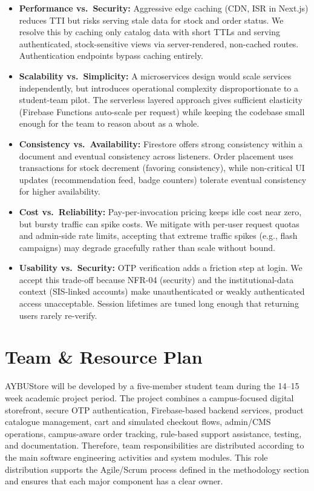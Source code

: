 \documentclass[11pt,a4paper]{article}
\begin{document}
\begin{itemize}
    \item \textbf{Performance vs.\ Security:} Aggressive edge caching (CDN, ISR in Next.js) reduces TTI but risks serving stale data for stock and order status. We resolve this by caching only catalog data with short TTLs and serving authenticated, stock-sensitive views via server-rendered, non-cached routes. Authentication endpoints bypass caching entirely.
    \item \textbf{Scalability vs.\ Simplicity:} A microservices design would scale services independently, but introduces operational complexity disproportionate to a student-team pilot. The serverless layered approach gives sufficient elasticity (Firebase Functions auto-scale per request) while keeping the codebase small enough for the team to reason about as a whole.
    \item \textbf{Consistency vs.\ Availability:} Firestore offers strong consistency within a document and eventual consistency across listeners. Order placement uses transactions for stock decrement (favoring consistency), while non-critical UI updates (recommendation feed, badge counters) tolerate eventual consistency for higher availability.
    \item \textbf{Cost vs.\ Reliability:} Pay-per-invocation pricing keeps idle cost near zero, but bursty traffic can spike costs. We mitigate with per-user request quotas and admin-side rate limits, accepting that extreme traffic spikes (e.g., flash campaigns) may degrade gracefully rather than scale without bound.
    \item \textbf{Usability vs.\ Security:} OTP verification adds a friction step at login. We accept this trade-off because NFR-04 (security) and the institutional-data context (SIS-linked accounts) make unauthenticated or weakly authenticated access unacceptable. Session lifetimes are tuned long enough that returning users rarely re-verify.
\end{itemize}

\newpage


\section{Team \& Resource Plan}
\label{sec:team-resource-plan}

AYBUStore will be developed by a five-member student team during the
14--15 week academic project period. The project combines a campus-focused
digital storefront, secure OTP authentication, Firebase-based backend
services, product catalogue management, cart and simulated checkout flows,
admin/CMS operations, campus-aware order tracking, rule-based support
assistance, testing, and documentation. Therefore, team responsibilities
are distributed according to the main software engineering activities and
system modules. This role distribution supports the Agile/Scrum process
defined in the methodology section and ensures that each major component
has a clear owner.
\end{document}
